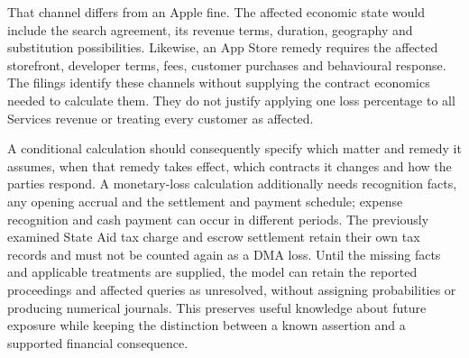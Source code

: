That channel differs from an Apple fine. The affected economic state would
include the search agreement, its revenue terms, duration, geography and
substitution possibilities. Likewise, an App Store remedy requires the
affected storefront, developer terms, fees, customer purchases and behavioural
response. The filings identify these channels without supplying the contract
economics needed to calculate them. They do not justify applying one loss
percentage to all Services revenue or treating every customer as affected.

A conditional calculation should consequently specify which matter and
remedy it assumes, when that remedy takes effect, which contracts it changes
and how the parties respond. A monetary-loss calculation additionally needs
recognition facts, any opening accrual and the settlement and payment schedule;
expense recognition and cash payment can occur in different periods. The
previously examined State Aid tax charge and escrow settlement retain their
own tax records and must not be counted again as a DMA loss. Until the missing
facts and applicable treatments are supplied, the model can retain the reported
proceedings and affected queries as unresolved, without assigning probabilities
or producing numerical journals. This preserves useful knowledge about future
exposure while keeping the distinction between a known assertion and a
supported financial consequence.
